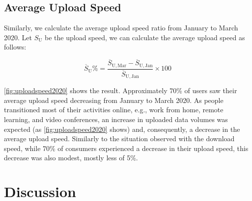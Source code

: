 \documentclass[conference,10pt]{IEEEtran}
\begin{document}

\subsection{Average Upload Speed}\label{sec:average-upload-speed}

Similarly, we calculate the average upload speed ratio from January to March 2020. Let $S_{\text{U}}$ be the upload speed, we can calculate the average upload speed as follows:

\begin{equation}
\overline{S}_{\text{U}}\% = \frac{\overline{S}_{\text{U},\, \text{Mar}}-\overline{S}_{\text{U},\, \text{Jan}}}{\overline{S}_{\text{U},\, \text{Jan}}}\times 100
\end{equation}


\cref{fig:uploadspeed2020} shows the result. Approximately 70\% of users saw their average upload speed decreasing from January to March 2020. As people transitioned most of their activities online, e.g., work from home, remote learning, and video conferences, an increase in uploaded data volumes was expected (as \cref{fig:uploadspeed2020} shows) and, consequently, a decrease in the average upload speed. Similarly to the situation observed with the download speed, while 70\% of consumers experienced a decrease in their upload speed, this decrease was also modest, mostly less of 5\%.




\section{Discussion}\label{sec:discussion}
\end{document}
